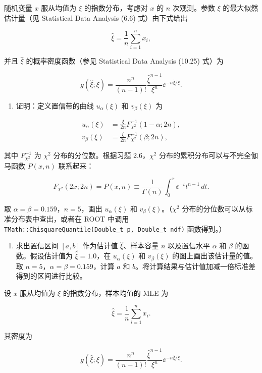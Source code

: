 \begin{question}
随机变量 \(x\) 服从均值为 \(\xi\) 的指数分布，考虑对 \(x\) 的 \(n\)
次观测。参数 \(\xi\) 的最大似然估计量（见 Statistical Data Analysis
(6.6) 式）由下式给出

\[
\hat\xi=\frac1n\sum_{i=1}^{n}x_i,
\]

并且 \(\hat\xi\) 的概率密度函数（参见 Statistical Data Analysis (10.25)
式）为

\[
g(\hat\xi;\xi)=\frac{n^n}{(n-1)!}\frac{\hat\xi^{n-1}}{\xi^n}\ee^{-n\hat\xi/\xi}.
\]

\begin{enumerate}
\item
  证明：定义置信带的曲线 \(u_\alpha(\xi)\) 和 \(v_\beta(\xi)\) 为
\end{enumerate}

\[
\begin{split}
u_\alpha(\xi)&=\frac{\xi}{2n}F_{\chi^2}^{-1}(1-\alpha;2n),\\
v_\beta(\xi)&=\frac{\xi}{2n}F_{\chi^2}^{-1}(\beta;2n),
\end{split}
\]

其中 \(F_{\chi^2}^{-1}\) 为 \(\chi^2\) 分布的分位数。根据习题
2.6，\(\chi^2\) 分布的累积分布可以与不完全伽马函数 \(P(x,n)\) 联系起来：

\[
F_{\chi^2}(2x;2n)=P(x,n)\equiv\frac1{\Gamma(n)}\int_0^x \ee^{-t}t^{n-1}\,dt.
\]

取 \(\alpha=\beta=0.159\)，\(n=5\)，画出 \(u_\alpha(\xi)\) 和
\(v_\beta(\xi)\)。（\(\chi^2\)
分布的分位数可以从标准分布表中查出，或者在 ROOT 中调用
\texttt{TMath::ChisquareQuantile(Double\_t\ p,\ Double\_t\ ndf)}
函数得到。）

\begin{enumerate}[start=2]
\item
  求出置信区间 \([a,b]\) 作为估计值 \(\hat\xi\)、样本容量 \(n\)
  以及置信水平 \(\alpha\) 和 \(\beta\) 的函数。假设估计值为
  \(\hat\xi=1.0\)，在 \(u_\alpha(\xi)\) 和 \(v_\beta(\xi)\)
  的图上画出该估计量的值。取 \(n=5\)，\(\alpha=\beta=0.159\)，计算 \(a\)
  和 \(b\)。将计算结果与估计值加减一倍标准差得到的区间进行比较。
\end{enumerate}
\begin{solution}
设 \(x\) 服从均值为 \(\xi\) 的指数分布，样本均值的 MLE 为

\[
\hat\xi=\frac1n\sum_{i=1}^n x_i.
\]

其密度为

\[
g(\hat\xi;\xi)=\frac{n^n}{(n-1)!}\frac{\hat\xi^{n-1}}{\xi^n}\ee^{-n\hat\xi/\xi}.
\]


\end{solution}
\end{question}
